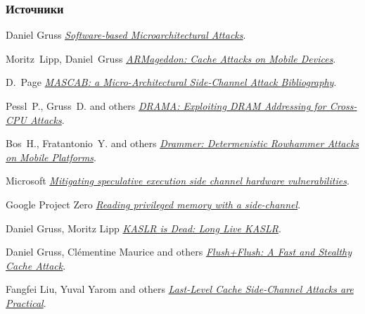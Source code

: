 \begin{frame}[allowframebreaks]
  \frametitle<presentation>{Источники}
  \begin{thebibliography}{10}
    \beamertemplatebookbibitems


    Daniel Gruss
    \newblock \href{https://gruss.cc/files/phd_thesis.pdf}{\em Software-based Microarchitectural Attacks}.

    Moritz~Lipp, Daniel~Gruss
    \newblock \href{https://www.blackhat.com/docs/eu-16/materials/eu-16-Lipp-ARMageddon-How-Your-Smartphone-CPU-Breaks-Software-Level-Security-And-Privacy-wp.pdf}{\em ARMageddon: Cache Attacks on Mobile Devices}.

    D.~Page
    \newblock \href{http://www.github.com/danpage/mascab}{\em {MASCAB}: a {M}icro-{A}rchitectural {S}ide-{C}hannel {A}ttack {B}ibliography}.

    Pessl~P., Gruss~D. and others
    \newblock \href{https://www.blackhat.com/docs/eu-16/materials/eu-16-Schwarz-How-Your-DRAM-Becomes-A-Security-Problem-wp.pdf}{\em DRAMA: Exploiting DRAM Addressing for Cross-CPU Attacks}.
    
    Bos~H., Fratantonio~Y. and others
    \newblock \href{https://gruss.cc/files/drammer.pdf}{\em Drammer: Determenistic Rowhammer Attacks on Mobile Platforms}.

    Microsoft
    \newblock \href{https://blogs.technet.microsoft.com/srd/2018/03/15/mitigating-speculative-execution-side-channel-hardware-vulnerabilities/}{\em Mitigating speculative execution side channel hardware vulnerabilities}.

    Google Project Zero
    \newblock \href{https://googleprojectzero.blogspot.com/2018/01/reading-privileged-memory-with-side.html}{\em Reading privileged memory with a side-channel}.

    Daniel Gruss, Moritz Lipp
    \newblock \href{https://gruss.cc/files/kaiser.pdf}{\em KASLR is Dead: Long Live KASLR}.

    Daniel Gruss, Clémentine Maurice and others
    \newblock \href{https://arxiv.org/abs/1511.04594}{\em Flush+Flush: A Fast and Stealthy Cache Attack}.

    Fangfei Liu, Yuval Yarom and others
    \newblock \href{http://palms.ee.princeton.edu/system/files/SP_vfinal.pdf}{\em Last-Level Cache Side-Channel Attacks are Practical}.


\end{thebibliography}
\end{frame}
